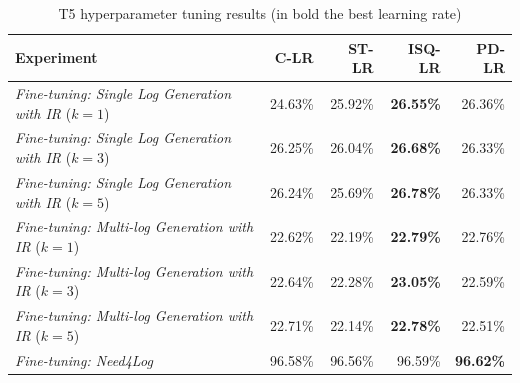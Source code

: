 \begin{table}[h!]
	\centering
	\caption{T5 hyperparameter tuning results (in bold the best learning rate)\vspace{-0.3cm}}
	\begin{tabular}{lrrrr}
		\toprule
		\textbf{Experiment}                  																		& \textbf{C-LR}              & \textbf{ST-LR}      & \textbf{ISQ-LR}        & \textbf{PD-LR} \\
		\midrule
		\textit{Fine-tuning: Single Log Generation with IR} ($k=1$)                         &   24.63\%                & 25.92\%    		           & \textbf{26.55\%}           &  26.36\%         \\
		\textit{Fine-tuning: Single Log Generation with IR} ($k=3$)                        &   26.25\%                & 26.04\%    		           & \textbf{26.68\%}          &  26.33\%         \\
		\textit{Fine-tuning: Single Log Generation with IR} ($k=5$)                         &  26.24\%                & 25.69\%    		           & \textbf{26.78\%}           &  26.33\%         \\
		\midrule
		\textit{Fine-tuning: Multi-log Generation with IR} ($k=1$)                         &   22.62\%                & 22.19\%    		           & \textbf{22.79\%}           &  22.76\%         \\
		\textit{Fine-tuning: Multi-log Generation with IR} ($k=3$)                        &   22.64\%                & 22.28\%    		           & \textbf{23.05\%}          &  22.59\%         \\
		\textit{Fine-tuning: Multi-log Generation with IR} ($k=5$)                         &   22.71\%                & 22.14\%    		           & \textbf{22.78\%}           &  22.51\%         \\
		\midrule
		\textit{Fine-tuning: Need4Log} & 96.58\%       & 96.56\%        & 96.59\%          & \textbf{96.62\%}\\
		\bottomrule
	\end{tabular}
	\vspace{-0.3cm}
	\label{tab:hp-results}
\end{table}

